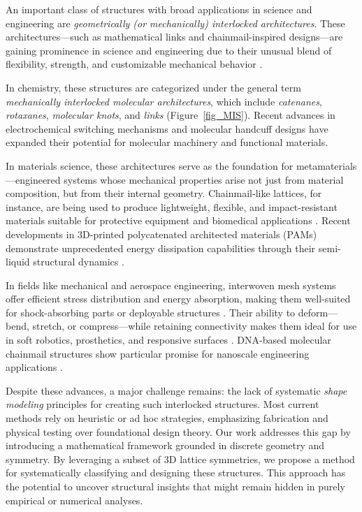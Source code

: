 \documentclass[times,twocolumn,final]{elsarticle}
\newcommand{\ergun}[1]{{\color{red} #1}}
\begin{document}
An important class of structures with broad applications in science and engineering are \textit{geometrically (or mechanically) interlocked architectures}. These architectures—such as mathematical links and chainmail-inspired designs—are gaining prominence in science and engineering due to their unusual blend of flexibility, strength, and customizable mechanical behavior \cite{carlucci2003polycatenation,zhou20253d,cheng20253d,zhang2025recognizing,tang2023chainmail}.

In chemistry, these structures are categorized under the general term \textit{mechanically interlocked molecular architectures}, which include \textit{catenanes}, \textit{rotaxanes}, \textit{molecular knots}, and \textit{links} (Figure~\ref{fig_MIS}). Recent advances in electrochemical switching mechanisms \cite{electrochem2024} and molecular handcuff designs \cite{handcuffs2022} have expanded their potential for molecular machinery and functional materials.

In materials science, these architectures serve as the foundation for metamaterials—engineered systems whose mechanical properties arise not just from material composition, but from their internal geometry. Chainmail-like lattices, for instance, are being used to produce lightweight, flexible, and impact-resistant materials suitable for protective equipment \cite{nature2016interlocked,iass2024parametric} and biomedical applications \cite{pmc2024deployable}. Recent developments in 3D-printed polycatenated architected materials (PAMs) demonstrate unprecedented energy dissipation capabilities through their semi-liquid structural dynamics \cite{popularmechanics2025}.

In fields like mechanical and aerospace engineering, interwoven mesh systems offer efficient stress distribution and energy absorption, making them well-suited for shock-absorbing parts or deployable structures \cite{pmc2024deployable}. Their ability to deform—bend, stretch, or compress—while retaining connectivity makes them ideal for use in soft robotics, prosthetics, and responsive surfaces \cite{arxiv2024chainmail}. DNA-based molecular chainmail structures show particular promise for nanoscale engineering applications \cite{arxiv2024chainmail}.

Despite these advances, a major challenge remains: the lack of systematic \textit{shape modeling} principles for creating such interlocked structures. Most current methods rely on heuristic or ad hoc strategies, emphasizing fabrication and physical testing over foundational design theory. Our work addresses this gap by introducing a mathematical framework grounded in discrete geometry and symmetry. \ergun{By leveraging a subset of 3D lattice symmetries, we propose a method for systematically classifying and designing these structures. This approach has the potential to uncover structural insights that might remain hidden in purely empirical or numerical analyses.}
\end{document}
